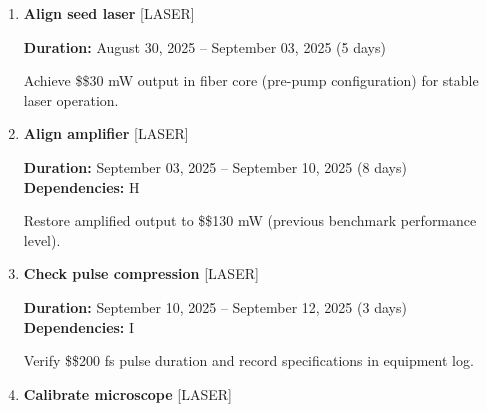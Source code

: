 \documentclass[landscape,a4paper]{article}
\begin{document}
\begin{enumerate}[leftmargin=1.5cm, itemsep=1em, parsep=0.5em]
    \item \textcolor{researchexp}{\textbf{\large Align seed laser}}
          \hfill \textcolor{black!60}{\small [LASER]}
          
          \vspace{0.2em}
          \textcolor{black!70}{\textbf{Duration:} August 30, 2025 -- September 03, 2025 (5 days)}

          \vspace{0.4em}
          \begin{minipage}[t]{0.9\textwidth}
          \textcolor{black!85}{Achieve \$\geq\$30 mW output in fiber core (pre-pump configuration) for stable laser operation.}
          \end{minipage}

    \item \textcolor{researchexp}{\textbf{\large Align amplifier}}
          \hfill \textcolor{black!60}{\small [LASER]}
          
          \vspace{0.2em}
          \textcolor{black!70}{\textbf{Duration:} September 03, 2025 -- September 10, 2025 (8 days)}
          \\[0.2em]\textcolor{black!70}{\textbf{Dependencies:} H}\n
          \vspace{0.4em}
          \begin{minipage}[t]{0.9\textwidth}
          \textcolor{black!85}{Restore amplified output to \$\geq\$130 mW (previous benchmark performance level).}
          \end{minipage}

    \item \textcolor{researchexp}{\textbf{\large Check pulse compression}}
          \hfill \textcolor{black!60}{\small [LASER]}
          
          \vspace{0.2em}
          \textcolor{black!70}{\textbf{Duration:} September 10, 2025 -- September 12, 2025 (3 days)}
          \\[0.2em]\textcolor{black!70}{\textbf{Dependencies:} I}\n
          \vspace{0.4em}
          \begin{minipage}[t]{0.9\textwidth}
          \textcolor{black!85}{Verify \$\leq\$200 fs pulse duration and record specifications in equipment log.}
          \end{minipage}

    \item \textcolor{researchexp}{\textbf{\large Calibrate microscope}}
          \hfill \textcolor{black!60}{\small [LASER]}
          

\end{enumerate}
\end{document}
